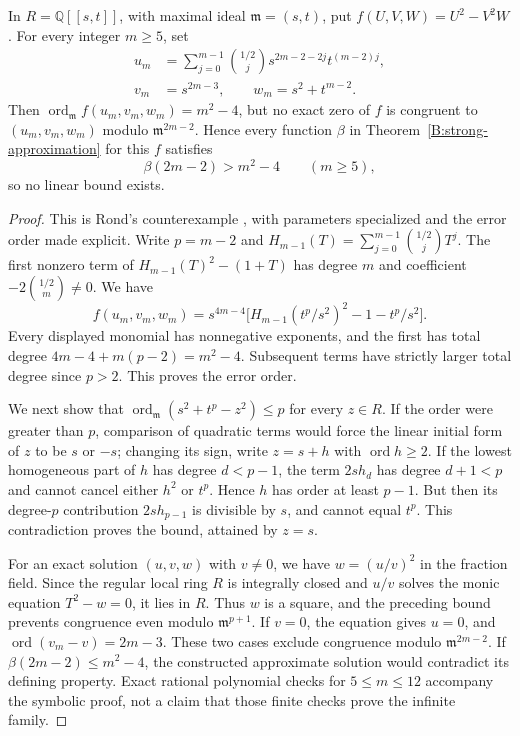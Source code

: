 \begin{proposition}\label{B:nonlinear-Artin}
In $R=\mathbb Q[[s,t]]$, with maximal ideal $\mathfrak m=(s,t)$, put $f(U,V,W)=U^2-V^2W$. For every integer $m\ge5$, set
\[
 \begin{split}
 u_m&=\sum_{j=0}^{m-1}{\binom{1/2}{j}}
                 s^{2m-2-2j}t^{(m-2)j},\\
 v_m&=s^{2m-3},\qquad w_m=s^2+t^{m-2}.
 \end{split}
\]
Then $\operatorname{ord}_{\mathfrak m}f(u_m,v_m,w_m)=m^2-4$, but no exact zero of $f$ is congruent to $(u_m,v_m,w_m)$ modulo $\mathfrak m^{2m-2}$. Hence every function $\beta$ in Theorem~\ref{B:strong-approximation} for this $f$ satisfies
\[
 \beta(2m-2)>m^2-4\qquad(m\ge5),
\]
so no linear bound exists.
\end{proposition}
\begin{proof}
This is Rond's counterexample \cite[Theorem 1.2 and \S3]{BRond2005}, with parameters specialized and the error order made explicit. Write $p=m-2$ and $H_{m-1}(T)=\sum_{j=0}^{m-1}\binom{1/2}{j}T^j$. The first nonzero term of $H_{m-1}(T)^2-(1+T)$ has degree $m$ and coefficient $-2\binom{1/2}{m}\ne0$. We have
\[
 f(u_m,v_m,w_m)=s^{4m-4}
       \bigl[H_{m-1}(t^p/s^2)^2-1-t^p/s^2\bigr].
\]
Every displayed monomial has nonnegative exponents, and the first has total degree $4m-4+m(p-2)=m^2-4$. Subsequent terms have strictly larger total degree since $p>2$. This proves the error order.

We next show that $\operatorname{ord}_{\mathfrak m}(s^2+t^p-z^2)\le p$ for every $z\in R$. If the order were greater than $p$, comparison of quadratic terms would force the linear initial form of $z$ to be $s$ or $-s$; changing its sign, write $z=s+h$ with $\operatorname{ord}h\ge2$. If the lowest homogeneous part of $h$ has degree $d<p-1$, the term $2sh_d$ has degree $d+1<p$ and cannot cancel either $h^2$ or $t^p$. Hence $h$ has order at least $p-1$. But then its degree-$p$ contribution $2sh_{p-1}$ is divisible by $s$, and cannot equal $t^p$. This contradiction proves the bound, attained by $z=s$.

For an exact solution $(u,v,w)$ with $v\ne0$, we have $w=(u/v)^2$ in the fraction field. Since the regular local ring $R$ is integrally closed and $u/v$ solves the monic equation $T^2-w=0$, it lies in $R$. Thus $w$ is a square, and the preceding bound prevents congruence even modulo $\mathfrak m^{p+1}$. If $v=0$, the equation gives $u=0$, and $\operatorname{ord}(v_m-v)=2m-3$. These two cases exclude congruence modulo $\mathfrak m^{2m-2}$. If $\beta(2m-2)\le m^2-4$, the constructed approximate solution would contradict its defining property. Exact rational polynomial checks for $5\le m\le12$ accompany the symbolic proof, not a claim that those finite checks prove the infinite family.
\end{proof}

